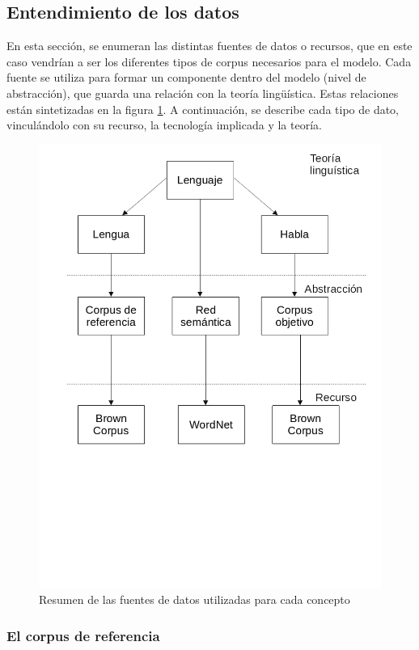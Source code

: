 \documentclass[12pt,letterpaper,twoside]{article}
\begin{document}
\subsection{Entendimiento de los datos}
\label{sec:org96a0f9b}

En esta sección, se enumeran las distintas fuentes de datos o
recursos, que en este caso vendrían a ser los diferentes tipos de
corpus necesarios para el modelo. Cada fuente se utiliza para
formar un componente dentro del modelo (nivel de abstracción), que
guarda una relación con la teoría lingüística.  Estas relaciones
están sintetizadas en la figura \ref{fig:orgea9ff64}.
A continuación, se describe cada tipo de dato, vinculándolo con su
recurso, la tecnología implicada y la teoría.

\begin{figure}[htbp]
\centering
\includegraphics[width=.9\linewidth]{./assets/entendimiento_de_los_datos.png}
\caption{\label{fig:orgea9ff64}Resumen de las fuentes de datos utilizadas para cada concepto}
\end{figure}



\subsubsection{El corpus de referencia}
\label{sec:org2b01527}
\end{document}
